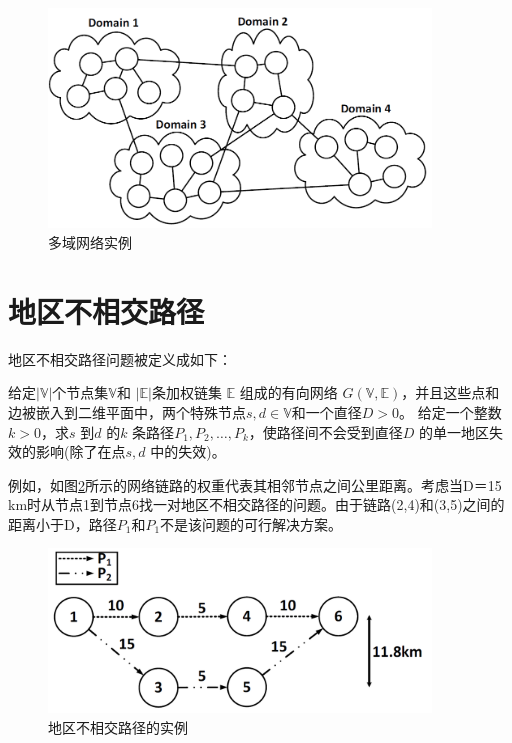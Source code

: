 \begin{figure}[htbp]
  \centering
  \includegraphics[width=4.0in]{figures/MultiDomainNetwork}
  \caption{多域网络实例}
  \label{fig:MultiDomainNetwork}
\end{figure}
\section{地区不相交路径}
地区不相交路径问题被定义成如下：

\begin{definition}[地区不相交路径问题]
给定$|\mathbb{V}|$个节点集$\mathbb{V}$和 $|\mathbb{E}|$条加权链集 $\mathbb{E}$ 组成的有向网络 $G(\mathbb{V},\mathbb{E})$，并且这些点和边被嵌入到二维平面中，两个特殊节点$s,d\in\mathbb{V}$和一个直径$D>0$。 给定一个整数$k>0$，求$s$ 到$d$ 的$k$ 条路径$P_1,P_2,\ldots,P_k$，使路径间不会受到直径$D$ 的单一地区失效的影响(除了在点$s,d$ 中的失效)。
\end{definition}

例如，如图\ref{fig:RegionDisjointPath}所示的网络链路的权重代表其相邻节点之间公里距离。考虑当D＝15 km时从节点1到节点6找一对地区不相交路径的问题。由于链路(2,4)和(3,5)之间的距离小于D，路径$P_1$和$P_1$不是该问题的可行解决方案。


\begin{figure}[htbp]
  \centering
  \includegraphics[width=4.0in]{figures/RegionDisjointPath}
  \caption{地区不相交路径的实例}
  \label{fig:RegionDisjointPath}
\end{figure}
